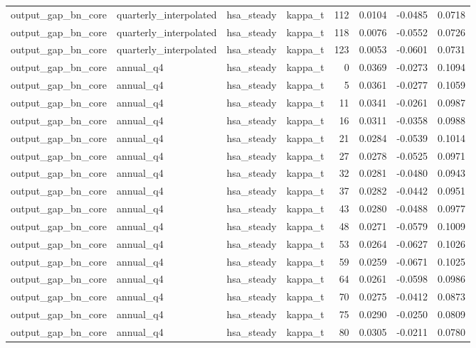 \begin{tabular}{llllrrrr}
output\_gap\_bn\_core & quarterly\_interpolated & hsa\_steady & kappa\_t & 112 & 0.0104 & -0.0485 & 0.0718 \\
output\_gap\_bn\_core & quarterly\_interpolated & hsa\_steady & kappa\_t & 118 & 0.0076 & -0.0552 & 0.0726 \\
output\_gap\_bn\_core & quarterly\_interpolated & hsa\_steady & kappa\_t & 123 & 0.0053 & -0.0601 & 0.0731 \\
output\_gap\_bn\_core & annual\_q4 & hsa\_steady & kappa\_t & 0 & 0.0369 & -0.0273 & 0.1094 \\
output\_gap\_bn\_core & annual\_q4 & hsa\_steady & kappa\_t & 5 & 0.0361 & -0.0277 & 0.1059 \\
output\_gap\_bn\_core & annual\_q4 & hsa\_steady & kappa\_t & 11 & 0.0341 & -0.0261 & 0.0987 \\
output\_gap\_bn\_core & annual\_q4 & hsa\_steady & kappa\_t & 16 & 0.0311 & -0.0358 & 0.0988 \\
output\_gap\_bn\_core & annual\_q4 & hsa\_steady & kappa\_t & 21 & 0.0284 & -0.0539 & 0.1014 \\
output\_gap\_bn\_core & annual\_q4 & hsa\_steady & kappa\_t & 27 & 0.0278 & -0.0525 & 0.0971 \\
output\_gap\_bn\_core & annual\_q4 & hsa\_steady & kappa\_t & 32 & 0.0281 & -0.0480 & 0.0943 \\
output\_gap\_bn\_core & annual\_q4 & hsa\_steady & kappa\_t & 37 & 0.0282 & -0.0442 & 0.0951 \\
output\_gap\_bn\_core & annual\_q4 & hsa\_steady & kappa\_t & 43 & 0.0280 & -0.0488 & 0.0977 \\
output\_gap\_bn\_core & annual\_q4 & hsa\_steady & kappa\_t & 48 & 0.0271 & -0.0579 & 0.1009 \\
output\_gap\_bn\_core & annual\_q4 & hsa\_steady & kappa\_t & 53 & 0.0264 & -0.0627 & 0.1026 \\
output\_gap\_bn\_core & annual\_q4 & hsa\_steady & kappa\_t & 59 & 0.0259 & -0.0671 & 0.1025 \\
output\_gap\_bn\_core & annual\_q4 & hsa\_steady & kappa\_t & 64 & 0.0261 & -0.0598 & 0.0986 \\
output\_gap\_bn\_core & annual\_q4 & hsa\_steady & kappa\_t & 70 & 0.0275 & -0.0412 & 0.0873 \\
output\_gap\_bn\_core & annual\_q4 & hsa\_steady & kappa\_t & 75 & 0.0290 & -0.0250 & 0.0809 \\
output\_gap\_bn\_core & annual\_q4 & hsa\_steady & kappa\_t & 80 & 0.0305 & -0.0211 & 0.0780 \\

\end{tabular}

